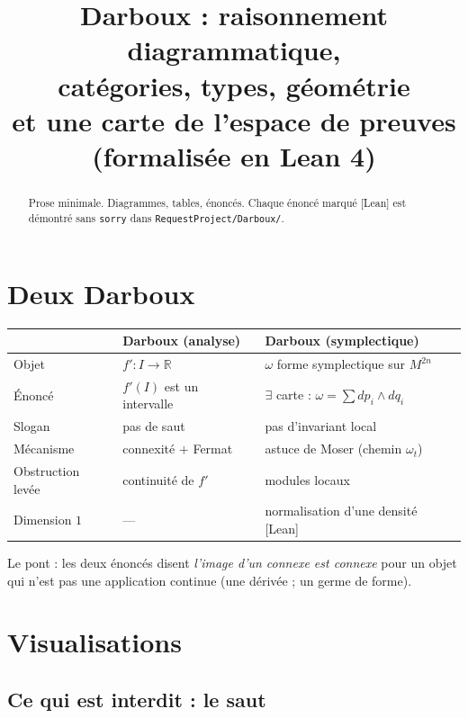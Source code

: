 \documentclass[11pt,a4paper]{article}
\title{Darboux : raisonnement diagrammatique,\\ catégories, types, géométrie\\[2mm]
\large et une carte de l'espace de preuves (formalisée en Lean 4)}
\author{}
\date{}
\theoremstyle{plain}
\theoremstyle{definition}
\theoremstyle{remark}
\newcommand{\R}{\mathbb{R}}
\begin{document}
\maketitle

\begin{abstract}
\noindent Prose minimale. Diagrammes, tables, énoncés. Chaque énoncé marqué
\textsf{[Lean]} est démontré sans \texttt{sorry} dans \texttt{RequestProject/Darboux/}.
\end{abstract}

\section{Deux Darboux}

\begin{center}
\begin{tabular}{@{}lll@{}}
\toprule
& \textbf{Darboux (analyse)} & \textbf{Darboux (symplectique)}\\
\midrule
Objet & $f' : I \to \R$ & $\omega$ forme symplectique sur $M^{2n}$\\
Énoncé & $f'(I)$ est un intervalle & $\exists$ carte : $\omega = \sum dp_i\wedge dq_i$\\
Slogan & pas de saut & pas d'invariant local\\
Mécanisme & connexité $+$ Fermat & astuce de Moser (chemin $\omega_t$)\\
Obstruction levée & continuité de $f'$ & modules locaux\\
Dimension $1$ & --- & normalisation d'une densité \textsf{[Lean]}\\
\bottomrule
\end{tabular}
\end{center}

\medskip
\noindent Le pont : les deux énoncés disent \emph{\og{}l'image d'un connexe est connexe\fg{}} pour
un objet qui n'est pas une application continue (une dérivée ; un germe de forme).

\section{Visualisations}

\subsection{Ce qui est interdit : le saut}
\end{document}
